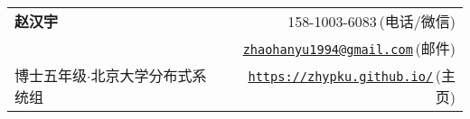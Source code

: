 
\newcommand{\paint}[3]{
    \begin{minipage}{#1}
        \texttt{[image: \#3]}
    \end{minipage} 
}

\newcommand{\myheader}{
    \begin{tabular*}{\textwidth}{l@{\extracolsep{\fill}}r}
        \specialrule{0em}{4pt}{4pt}
        \textbf{{\LARGE 赵汉宇}} & 158-1003-6083$\,${\color{labelgrey}(电话/微信)}\\
        & \href{mailto:zhaohanyu@pku.edu.cn}{\texttt{zhaohanyu1994@gmail.com}}$\,${\color{labelgrey}(邮件)} \\
        {\large 博士五年级$\cdot$北京大学分布式系统组} & \href{https://zhypku.github.io}{\texttt{https://zhypku.github.io/}}$\,${\color{labelgrey}(主页)} \\
    \end{tabular*}\\\vspace{0.1in}
}

\myheader


